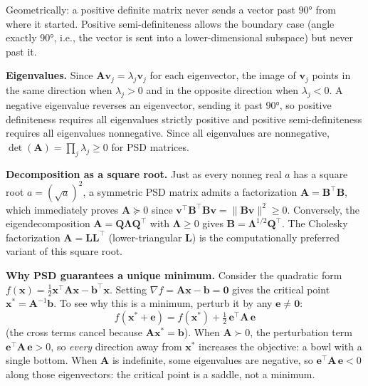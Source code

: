 \documentclass[main.tex]{subfiles}
\begin{document}
Geometrically: a positive definite matrix never sends a vector past $90°$ from where it started. Positive semi-definiteness allows the boundary case (angle exactly $90°$, i.e., the vector is sent into a lower-dimensional subspace) but never past it.

\textbf{Eigenvalues.} Since $\mathbf{A}\mathbf{v}_j = \lambda_j\mathbf{v}_j$ for each eigenvector, the image of $\mathbf{v}_j$ points in the same direction when $\lambda_j > 0$ and in the opposite direction when $\lambda_j < 0$. A negative eigenvalue reverses an eigenvector, sending it past $90°$, so positive definiteness requires all eigenvalues strictly positive and positive semi-definiteness requires all eigenvalues nonnegative. Since all eigenvalues are nonnegative, $\det(\mathbf{A}) = \prod_j\lambda_j \geq 0$ for PSD matrices.

\textbf{Decomposition as a square root.} Just as every nonneg real $a$ has a square root $a = (\sqrt{a})^2$, a symmetric PSD matrix admits a factorization $\mathbf{A} = \mathbf{B}^\top\mathbf{B}$, which immediately proves $\mathbf{A} \succeq 0$ since $\mathbf{v}^\top\mathbf{B}^\top\mathbf{B}\mathbf{v} = \|\mathbf{B}\mathbf{v}\|^2 \geq 0$. Conversely, the eigendecomposition $\mathbf{A} = \mathbf{Q}\boldsymbol{\Lambda}\mathbf{Q}^\top$ with $\boldsymbol{\Lambda} \geq 0$ gives $\mathbf{B} = \boldsymbol{\Lambda}^{1/2}\mathbf{Q}^\top$. The Cholesky factorization $\mathbf{A} = \mathbf{L}\mathbf{L}^\top$ (lower-triangular $\mathbf{L}$) is the computationally preferred variant of this square root.

\textbf{Why PSD guarantees a unique minimum.} Consider the quadratic form $f(\mathbf{x}) = \frac{1}{2}\mathbf{x}^\top\mathbf{A}\mathbf{x} - \mathbf{b}^\top\mathbf{x}$. Setting $\nabla f = \mathbf{A}\mathbf{x} - \mathbf{b} = \mathbf{0}$ gives the critical point $\mathbf{x}^* = \mathbf{A}^{-1}\mathbf{b}$. To see why this is a minimum, perturb it by any $\mathbf{e} \neq \mathbf{0}$:
$$f(\mathbf{x}^* + \mathbf{e}) = f(\mathbf{x}^*) + \tfrac{1}{2}\,\mathbf{e}^\top\mathbf{A}\,\mathbf{e}$$
(the cross terms cancel because $\mathbf{A}\mathbf{x}^* = \mathbf{b}$). When $\mathbf{A} \succ 0$, the perturbation term $\mathbf{e}^\top\mathbf{A}\,\mathbf{e} > 0$, so \textit{every} direction away from $\mathbf{x}^*$ increases the objective: a bowl with a single bottom. When $\mathbf{A}$ is indefinite, some eigenvalues are negative, so $\mathbf{e}^\top\mathbf{A}\,\mathbf{e} < 0$ along those eigenvectors: the critical point is a saddle, not a minimum.
\end{document}
